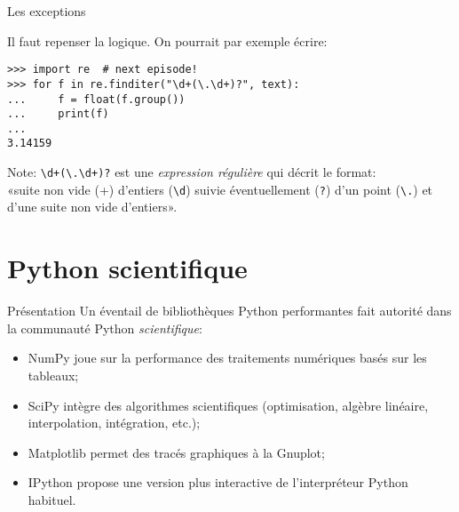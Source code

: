 \documentclass[dvipsnames]{beamer}
\begin{document}

\begin{frame} [fragile]{Les exceptions}

    Il faut repenser la logique. On pourrait par exemple écrire:

    \begin{verbatim}
>>> import re  # next episode!
>>> for f in re.finditer("\d+(\.\d+)?", text):
...     f = float(f.group())
...     print(f)
...
3.14159
\end{verbatim}
    {\footnotesize
    Note: \verb|\d+(\.\d+)?| est une \emph{expression régulière} qui décrit
    le format:\\ «suite non vide (+) d'entiers (\verb+\d+) suivie éventuellement
    (\verb+?+) d'un point (\verb+\.+) et d'une suite non vide d'entiers».
    }
\end{frame}

\section{Python scientifique}

\begin{frame}
    [fragile]{Présentation}
    Un éventail de bibliothèques Python performantes fait autorité dans la
    communauté Python \emph{scientifique}:

    \begin{itemize}
        \item \alert{NumPy} joue sur la performance des traitements numériques
              basés sur les tableaux;
        \item \alert{SciPy} intègre des algorithmes scientifiques (optimisation,
              algèbre linéaire, interpolation, intégration, etc.);
        \item \alert{Matplotlib} permet des tracés graphiques à la Gnuplot;
        \item \alert{IPython} propose une version plus interactive de
              l'interpréteur Python habituel.
    \end{itemize}
\end{frame}
\end{document}

